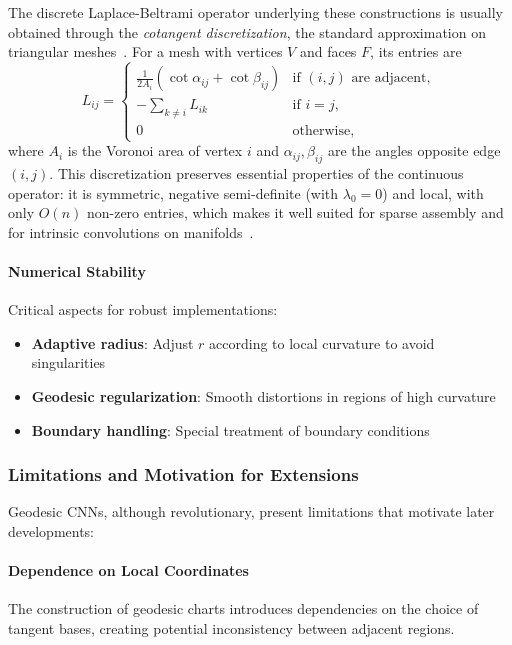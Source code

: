 The discrete Laplace-Beltrami operator underlying these constructions is usually obtained through the \emph{cotangent discretization}, the standard approximation on triangular meshes~\citep{bronstein2017geometricdeeplearning}. For a mesh with vertices $V$ and faces $F$, its entries are
\begin{equation}
L_{ij} = \begin{cases}
\tfrac{1}{2A_i}(\cot \alpha_{ij} + \cot \beta_{ij}) & \text{if } (i,j) \text{ are adjacent},\\
-\sum_{k \neq i} L_{ik} & \text{if } i = j,\\
0 & \text{otherwise},
\end{cases}
\end{equation}
where $A_i$ is the Voronoi area of vertex $i$ and $\alpha_{ij}, \beta_{ij}$ are the angles opposite edge $(i,j)$. This discretization preserves essential properties of the continuous operator: it is symmetric, negative semi-definite (with $\lambda_0 = 0$) and local, with only $O(n)$ non-zero entries, which makes it well suited for sparse assembly and for intrinsic convolutions on manifolds~\citep{masci2018geodesicconvolutionalneural}.

\paragraph{Numerical Stability}

Critical aspects for robust implementations:
\begin{itemize}
    \item \textbf{Adaptive radius}: Adjust $r$ according to local curvature to avoid singularities
    \item \textbf{Geodesic regularization}: Smooth distortions in regions of high curvature
    \item \textbf{Boundary handling}: Special treatment of boundary conditions
\end{itemize}

\subsubsection{Limitations and Motivation for Extensions}

Geodesic CNNs, although revolutionary, present limitations that motivate later developments:

\paragraph{Dependence on Local Coordinates}
The construction of geodesic charts introduces dependencies on the choice of tangent bases, creating potential inconsistency between adjacent regions.

